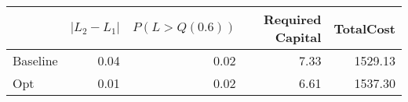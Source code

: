 \begin{tabular}{lrrrr}
\toprule
{} &  $|L_2 - L_1|$ &  $P(L > Q(0.6))$ &  Required Capital &  TotalCost \\
\midrule
Baseline &       0.04 &             0.02 &              7.33 &    1529.13 \\
Opt      &       0.01 &             0.02 &              6.61 &    1537.30 \\
\bottomrule
\end{tabular}
